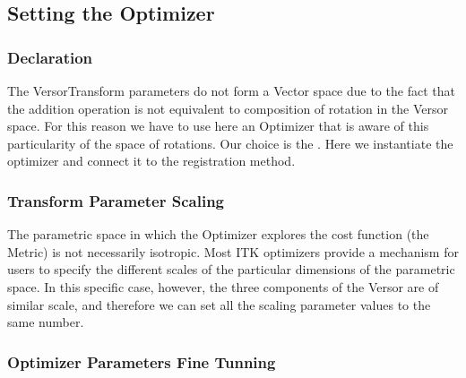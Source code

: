 \documentclass{InsightArticle}
\begin{document}
\begin{center}

\end{center}


\subsection{Setting the Optimizer}


\subsubsection{Declaration}

The VersorTransform parameters do not form a Vector space due to the fact that
the addition operation is not equivalent to composition of rotation in the
Versor space. For this reason we have to use here an Optimizer that is aware of
this particularity of the space of rotations. Our choice is the
. Here we instantiate the optimizer and
connect it to the registration method.

\begin{center}

\end{center}


\subsubsection{Transform Parameter Scaling}

The parametric space in which the Optimizer explores the cost function (the
Metric) is not necessarily isotropic.  Most ITK optimizers provide a mechanism
for users to specify the different scales of the particular dimensions of the
parametric space. In this specific case, however, the three components of the
Versor are of similar scale, and therefore we can set all the scaling parameter
values to the same number.

\begin{center}

\end{center}



\subsubsection{Optimizer Parameters Fine Tunning}
\end{document}
